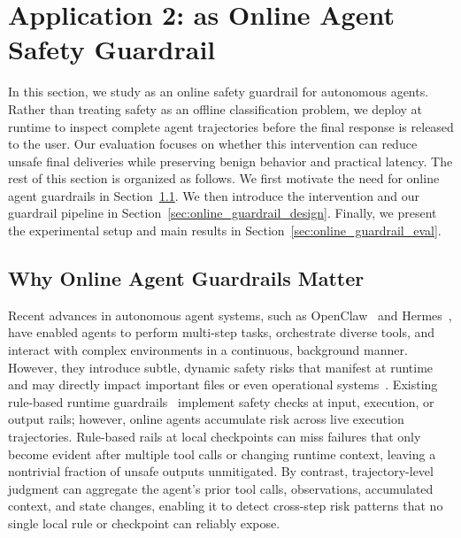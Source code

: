 \section{Application 2: \agentdog{} as Online Agent Safety Guardrail}

In this section, we study \agentdog{} as an online safety guardrail for autonomous agents. 
Rather than treating safety as an offline classification problem, we deploy \agentdog{} at runtime to inspect complete agent trajectories before the final response is released to the user. 
Our evaluation focuses on whether this intervention can reduce unsafe final deliveries while preserving benign behavior and practical latency. 
The rest of this section is organized as follows. 
We first motivate the need for online agent guardrails in Section~\ref{sec:online_guardrail_motivation}. 
We then introduce the \prereply{} intervention and our guardrail pipeline in Section~\ref{sec:online_guardrail_design}. 
Finally, we present the experimental setup and main results in Section~\ref{sec:online_guardrail_eval}.

\subsection{Why Online Agent Guardrails Matter}
\label{sec:online_guardrail_motivation}
Recent advances in autonomous agent systems, such as OpenClaw~\citep{steinberger2026openclaw} and Hermes~\citep{nousresearch2026hermes}, have enabled agents to perform multi-step tasks, orchestrate diverse tools, and interact with complex environments in a continuous, background manner. However, they introduce subtle, dynamic safety risks that manifest at runtime and may directly impact important files or even operational systems~\citep{narajala2025securingagenticai, he2024securityaiagents}. Existing rule-based runtime guardrails~\citep{
    deng2026tamingopenclaw,
    liu2026clawkeeper,
    zhang2026deepsight} implement safety checks at input, execution, or output rails; however, online agents accumulate risk across live execution trajectories. Rule-based rails at local checkpoints can miss failures that only become evident after multiple tool calls or changing runtime context, leaving
a nontrivial fraction of unsafe outputs unmitigated. By contrast, trajectory-level judgment can aggregate the agent's prior tool calls, observations, accumulated context, and state changes, enabling it to detect cross-step risk patterns that no single local rule or checkpoint can reliably expose.


